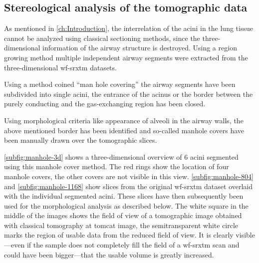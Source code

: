 \subsection{Stereological analysis of the tomographic data}
As mentioned in \autoref{ch:Introduction}, the interrelation of the acini in the lung tissue cannot be analyzed using classical sectioning methods, since the three-dimensional information of the airway structure is destroyed. Using a region growing method multiple independent airway segments were extracted from the three-dimensional \ac{wf-srxtm} datasets.

Using a method coined ``man hole covering'' the airway segments have been subdivided into single acini, \ie the entrance of the acinus or the border between the purely conducting and the gas-exchanging region has been closed. 

Using morphological criteria like appearance of alveoli in the airway walls, the above mentioned border has been identified and so-called manhole covers have been manually drawn over the tomographic slices. 

\autoref{subfig:manhole-3d} shows a three-dimensional overview of 6 acini segmented using this manhole cover method. The red rings show the location of four manhole covers, the other covers are not visible in this view. \autoref{subfig:manhole-804} and \ref{subfig:manhole-1168} show slices from the original \ac{wf-srxtm} dataset overlaid with the individual segmented acini. These slices have then subsequently been used for the morphological analysis as described below. The white square in the middle of the images shows the field of view of a tomographic image obtained with classical tomography at \ac{tomcat} image, the semitransparent white circle marks the region of usable data from the reduced field of view. It is clearly visible---even if the sample does not completely fill the field of a \ac{wf-srxtm} scan and could have been bigger---that the usable volume is greatly increased.

